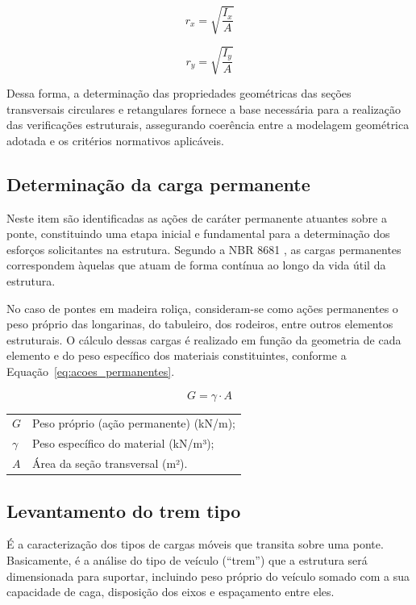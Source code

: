 \begin{equation}
r_x = \sqrt{\frac{I_x}{A}}
\label{eq:9}
\end{equation}

\begin{equation}
r_y = \sqrt{\frac{I_y}{A}}
\label{eq:10}
\end{equation}

Dessa forma, a determinação das propriedades geométricas das seções transversais circulares e retangulares fornece a base necessária para a realização das verificações estruturais, assegurando coerência entre a modelagem geométrica adotada e os critérios normativos aplicáveis.

\subsection{Determinação da carga permanente}\label{levan_estat}

Neste item são identificadas as ações de caráter permanente atuantes sobre a ponte, constituindo  uma etapa inicial e fundamental para a determinação dos esforços solicitantes na estrutura. Segundo a NBR 8681 \parencite{NBR8681:2025}, as cargas permanentes correspondem àquelas que atuam de forma contínua ao longo da vida útil da estrutura. 

No caso de pontes em madeira roliça, consideram-se como ações permanentes o peso próprio das longarinas, do tabuleiro, dos rodeiros, entre outros elementos estruturais. O cálculo dessas cargas é realizado em função da geometria de cada elemento e do peso específico dos materiais constituintes, conforme a Equação~\eqref{eq:acoes_permanentes}.

\begin{equation}
G = \gamma \cdot A
\label{eq:acoes_permanentes}
\end{equation}

\begin{tabular}{ll}
$G$ & Peso próprio (ação permanente) (kN/m); \\
$\gamma$ & Peso específico do material (kN/m³); \\
$A$ & Área da seção transversal (m²).
\end{tabular}

\subsection{Levantamento do trem tipo}\label{levan_trem}

É a caracterização dos tipos de cargas móveis que transita sobre uma ponte. Basicamente, é a análise do tipo de veículo (“trem”) que a estrutura será dimensionada para suportar, incluindo peso próprio do veículo somado com a sua capacidade de caga, disposição dos eixos e espaçamento entre eles.


